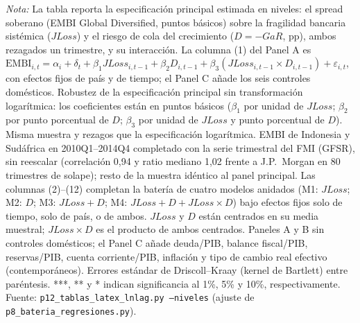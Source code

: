 \begin{landscape}
\begin{table}
\par\smallskip\parbox{\linewidth}{\scriptsize \textit{Nota:} La tabla reporta la especificación principal estimada en niveles: el spread soberano (EMBI Global Diversified, puntos básicos) sobre la fragilidad bancaria sistémica ($JLoss$) y el riesgo de cola del crecimiento ($D=-GaR$, pp), ambos rezagados un trimestre, y su interacción. La columna (1) del Panel A es $\mathrm{EMBI}_{i,t}=\alpha_i+\delta_t+\beta_1 JLoss_{i,t-1}+\beta_2 D_{i,t-1}+\beta_3(JLoss_{i,t-1}\times D_{i,t-1})+\varepsilon_{i,t}$, con efectos fijos de país y de tiempo; el Panel C añade los seis controles domésticos. Robustez de la especificación principal sin transformación logarítmica: los coeficientes están en puntos básicos ($\beta_1$ por unidad de $JLoss$; $\beta_2$ por punto porcentual de $D$; $\beta_3$ por unidad de $JLoss$ y punto porcentual de $D$). Misma muestra y rezagos que la especificación logarítmica. EMBI de Indonesia y Sudáfrica en 2010Q1--2014Q4 completado con la serie trimestral del FMI (GFSR), sin reescalar (correlación 0,94 y ratio mediano 1,02 frente a J.P.\ Morgan en 80 trimestres de solape); resto de la muestra idéntico al panel principal. Las columnas (2)--(12) completan la batería de cuatro modelos anidados (M1: $JLoss$; M2: $D$; M3: $JLoss+D$; M4: $JLoss+D+JLoss\times D$) bajo efectos fijos solo de tiempo, solo de país, o de ambos. $JLoss$ y $D$ están centrados en su media muestral; $JLoss\times D$ es el producto de ambos centrados. Paneles A y B sin controles domésticos; el Panel C añade deuda/PIB, balance fiscal/PIB, reservas/PIB, cuenta corriente/PIB, inflación y tipo de cambio real efectivo (contemporáneos). Errores estándar de Driscoll--Kraay (kernel de Bartlett) entre paréntesis. ***, ** y * indican significancia al 1\%, 5\% y 10\%, respectivamente. Fuente: \texttt{p12\_tablas\_latex\_lnlag.py --niveles} (ajuste de \texttt{p8\_bateria\_regresiones.py}).}
\end{table}
\end{landscape}
